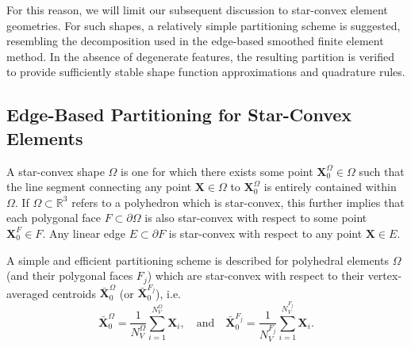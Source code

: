 	For this reason, we will limit our subsequent discussion to star-convex element geometries. For such shapes, a relatively simple partitioning scheme is suggested, resembling the decomposition used in the edge-based smoothed finite element method. In the absence of degenerate features, the resulting partition is verified to provide sufficiently stable shape function approximations and quadrature rules.

\subsection*{Edge-Based Partitioning for Star-Convex Elements}

	A star-convex shape $\Omega$ is one for which there exists some point $\mathbf{X}^{\Omega}_0 \in \Omega$ such that the line segment connecting any point $\mathbf{X} \in \Omega$ to $\mathbf{X}^{\Omega}_0$ is entirely contained within $\Omega$. If $\Omega \subset \mathbb{R}^3$ refers to a polyhedron which is star-convex, this further implies that each polygonal face $F \subset \partial \Omega$ is also star-convex with respect to some point $\mathbf{X}^{F}_0 \in F$. Any linear edge $E \subset \partial F$ is star-convex with respect to any point $\mathbf{X} \in E$.
	
	A simple and efficient partitioning scheme is described for polyhedral elements $\Omega$ (and their polygonal faces $F_j$) which are star-convex with respect to their vertex-averaged centroids $\bar{\mathbf{X}}^{\Omega}_0$ (or $\bar{\mathbf{X}}^{F_j}_0$), i.e.
	\begin{equation}
		\bar{\mathbf{X}}^{\Omega}_0 = \frac{1}{N^{\Omega}_V} \sum_{i = 1}^{N^{\Omega}_V} \mathbf{X}_{i}, \quad \text{and} \quad \bar{\mathbf{X}}^{F_j}_0 = \frac{1}{N^{F_j}_V} \sum_{i = 1}^{N^{F_j}_V} \mathbf{X}_{i}.
	\end{equation}
	
